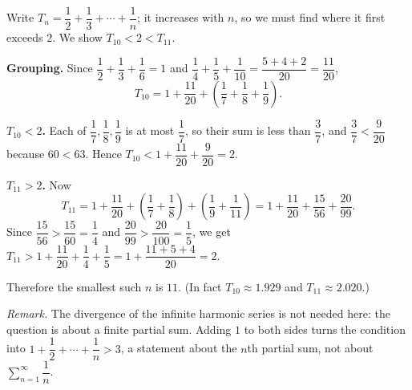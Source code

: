 Write $T_n=\dfrac{1}{2}+\dfrac{1}{3}+\cdots+\dfrac{1}{n}$; it increases with $n$, so we must find where it first exceeds $2$. We show $T_{10}<2<T_{11}$.

\textbf{Grouping.} Since $\dfrac{1}{2}+\dfrac{1}{3}+\dfrac{1}{6}=1$ and $\dfrac{1}{4}+\dfrac{1}{5}+\dfrac{1}{10}=\dfrac{5+4+2}{20}=\dfrac{11}{20}$,
\[
T_{10}=1+\dfrac{11}{20}+\left(\dfrac{1}{7}+\dfrac{1}{8}+\dfrac{1}{9}\right).
\]

\textbf{$T_{10}<2$.} Each of $\dfrac{1}{7},\dfrac{1}{8},\dfrac{1}{9}$ is at most $\dfrac{1}{7}$, so their sum is less than $\dfrac{3}{7}$, and $\dfrac{3}{7}<\dfrac{9}{20}$ because $60<63$. Hence $T_{10}<1+\dfrac{11}{20}+\dfrac{9}{20}=2$.

\textbf{$T_{11}>2$.} Now
\[
T_{11}=1+\dfrac{11}{20}+\left(\dfrac{1}{7}+\dfrac{1}{8}\right)+\left(\dfrac{1}{9}+\dfrac{1}{11}\right)
=1+\dfrac{11}{20}+\dfrac{15}{56}+\dfrac{20}{99}.
\]
Since $\dfrac{15}{56}>\dfrac{15}{60}=\dfrac{1}{4}$ and $\dfrac{20}{99}>\dfrac{20}{100}=\dfrac{1}{5}$, we get $T_{11}>1+\dfrac{11}{20}+\dfrac{1}{4}+\dfrac{1}{5}=1+\dfrac{11+5+4}{20}=2$.

Therefore the smallest such $n$ is $\boxed{11}$. (In fact $T_{10}\approx1.929$ and $T_{11}\approx2.020$.)

\emph{Remark.} The divergence of the infinite harmonic series is not needed here: the question is about a finite partial sum. Adding $1$ to both sides turns the condition into $1+\dfrac{1}{2}+\cdots+\dfrac{1}{n}>3$, a statement about the $n$th partial sum, not about $\displaystyle\sum_{n=1}^{\infty}\dfrac{1}{n}$.
